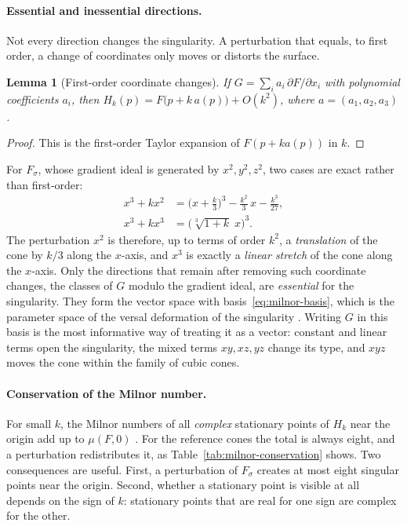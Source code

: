 \documentclass[12pt, a4paper, oneside]{book}
\theoremstyle{plain}
\newtheorem{lemma}[theorem]{Lemma}
\theoremstyle{definition}
\theoremstyle{remark}
\begin{document}
\paragraph{Essential and inessential directions.}
Not every direction changes the singularity. A perturbation that equals, to
first order, a change of coordinates only moves or distorts the surface.

\begin{lemma}[First-order coordinate changes]
\label{lem:trivial-directions}
If $G=\sum_i a_i\,\partial F/\partial x_i$ with polynomial coefficients $a_i$,
then $H_k(p)=F\big(p+k\,a(p)\big)+O(k^2)$, where $a=(a_1,a_2,a_3)$.
\end{lemma}

\begin{proof}
This is the first-order Taylor expansion of $F(p+ka(p))$ in $k$.
\end{proof}

For $F_\sigma$, whose gradient ideal is generated by $x^2,y^2,z^2$, two cases
are exact rather than first-order:
\begin{align}
\label{eq:translation}
x^3+kx^2&=\Big(x+\frac k3\Big)^3-\frac{k^2}{3}\,x-\frac{k^3}{27},\\
\label{eq:stretch}
x^3+kx^3&=\big(\sqrt[3]{1+k}\;x\big)^3 .
\end{align}
The perturbation $x^2$ is therefore, up to terms of order $k^2$, a
\emph{translation} of the cone by $k/3$ along the $x$-axis, and $x^3$ is
exactly a \emph{linear stretch} of the cone along the $x$-axis. Only the
directions that remain after removing such coordinate changes, the classes of
$G$ modulo the gradient ideal, are \emph{essential} for the singularity. They
form the vector space with basis~\eqref{eq:milnor-basis}, which is the
parameter space of the versal deformation of the singularity
\cite{arnold2012singularities,greuel2007introduction}. Writing $G$ in this
basis is the most informative way of treating it as a vector: constant and
linear terms open the singularity, the mixed terms $xy,xz,yz$ change its type,
and $xyz$ moves the cone within the family of cubic cones.

\paragraph{Conservation of the Milnor number.}
For small $k$, the Milnor numbers of all \emph{complex} stationary points of
$H_k$ near the origin add up to $\mu(F,0)$
\cite{milnor1968singular,greuel2007introduction}. For the reference cones the
total is always eight, and a perturbation redistributes it, as
Table~\ref{tab:milnor-conservation} shows. Two consequences are useful. First,
a perturbation of $F_\sigma$ creates at most eight singular points near the
origin. Second, whether a stationary point is visible at all depends on the
sign of $k$: stationary points that are real for one sign are complex for the
other.
\end{document}
